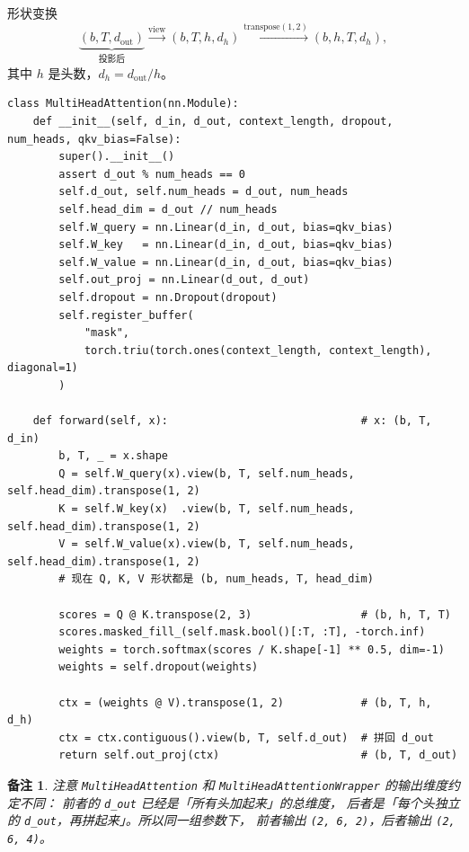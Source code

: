 \documentclass[11pt,a4paper]{ctexart}
\newtheorem{remark}[theorem]{备注}
\begin{document}
\begin{mathbox}{形状变换}
\[
  \underbrace{(b, T, d_{\text{out}})}_{\text{投影后}}
  \xrightarrow{\text{view}}
  (b, T, h, d_h)
  \xrightarrow{\text{transpose}(1,2)}
  (b, h, T, d_h),
\]
其中 $h$ 是头数，$d_h = d_{\text{out}} / h$。
\end{mathbox}

\begin{codebox}
\begin{lstlisting}
class MultiHeadAttention(nn.Module):
    def __init__(self, d_in, d_out, context_length, dropout, num_heads, qkv_bias=False):
        super().__init__()
        assert d_out % num_heads == 0
        self.d_out, self.num_heads = d_out, num_heads
        self.head_dim = d_out // num_heads
        self.W_query = nn.Linear(d_in, d_out, bias=qkv_bias)
        self.W_key   = nn.Linear(d_in, d_out, bias=qkv_bias)
        self.W_value = nn.Linear(d_in, d_out, bias=qkv_bias)
        self.out_proj = nn.Linear(d_out, d_out)
        self.dropout = nn.Dropout(dropout)
        self.register_buffer(
            "mask",
            torch.triu(torch.ones(context_length, context_length), diagonal=1)
        )

    def forward(self, x):                              # x: (b, T, d_in)
        b, T, _ = x.shape
        Q = self.W_query(x).view(b, T, self.num_heads, self.head_dim).transpose(1, 2)
        K = self.W_key(x)  .view(b, T, self.num_heads, self.head_dim).transpose(1, 2)
        V = self.W_value(x).view(b, T, self.num_heads, self.head_dim).transpose(1, 2)
        # 现在 Q, K, V 形状都是 (b, num_heads, T, head_dim)

        scores = Q @ K.transpose(2, 3)                 # (b, h, T, T)
        scores.masked_fill_(self.mask.bool()[:T, :T], -torch.inf)
        weights = torch.softmax(scores / K.shape[-1] ** 0.5, dim=-1)
        weights = self.dropout(weights)

        ctx = (weights @ V).transpose(1, 2)            # (b, T, h, d_h)
        ctx = ctx.contiguous().view(b, T, self.d_out)  # 拼回 d_out
        return self.out_proj(ctx)                      # (b, T, d_out)
\end{lstlisting}
\end{codebox}

\begin{remark}
注意 \texttt{MultiHeadAttention} 和 \texttt{MultiHeadAttentionWrapper} 的输出维度约定不同：
前者的 \texttt{d\_out} 已经是「所有头加起来」的总维度，
后者是「每个头独立的 \texttt{d\_out}，再拼起来」。所以同一组参数下，
前者输出 \texttt{(2, 6, 2)}，后者输出 \texttt{(2, 6, 4)}。
\end{remark}
\end{document}
